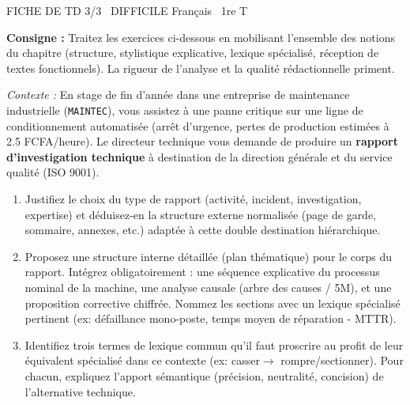 \documentclass[11pt]{article}
\begin{document}
\begin{tcolorbox}[enhanced,colback=popink,colframe=popink,arc=10pt,boxrule=0pt,left=12pt,right=12pt,top=9pt,bottom=9pt]
{\color{white}\popxbold\small FICHE DE TD 3/3 \textbullet\ DIFFICILE \hfill Français \textbullet\ 1re T\par}
\end{tcolorbox}
\vspace{4pt}
\noindent\textbf{Consigne :} Traitez les exercices ci-dessous en mobilisant l'ensemble des notions du chapitre (structure, stylistique explicative, lexique spécialisé, réception de textes fonctionnels). La rigueur de l'analyse et la qualité rédactionnelle priment.

\begin{exercice}
    \textit{Contexte :} En stage de fin d'année dans une entreprise de maintenance industrielle (\texttt{MAINTEC}), vous assistez à une panne critique sur une ligne de conditionnement automatisée (arrêt d'urgence, pertes de production estimées à \SI{2.5}{\million} FCFA/heure). Le directeur technique vous demande de produire un \textbf{rapport d'investigation technique} à destination de la direction générale et du service qualité (ISO 9001).
    \begin{enumerate}
        \item Justifiez le choix du type de rapport (activité, incident, investigation, expertise) et déduisez-en la structure externe normalisée (page de garde, sommaire, annexes, etc.) adaptée à cette double destination hiérarchique.
        \item Proposez une structure interne détaillée (plan thématique) pour le corps du rapport. Intégrez obligatoirement : une séquence explicative du processus nominal de la machine, une analyse causale (arbre des causes / 5M), et une proposition corrective chiffrée. Nommez les sections avec un lexique spécialisé pertinent (ex: \og défaillance mono-poste\fg, \og temps moyen de réparation - MTTR\fg).
        \item Identifiez trois termes de lexique commun qu'il faut proscrire au profit de leur équivalent spécialisé dans ce contexte (ex: \og casser\fg $\rightarrow$ \og rompre/sectionner\fg). Pour chacun, expliquez l'apport sémantique (précision, neutralité, concision) de l'alternative technique.
    \end{enumerate}
\end{exercice}
\end{document}
